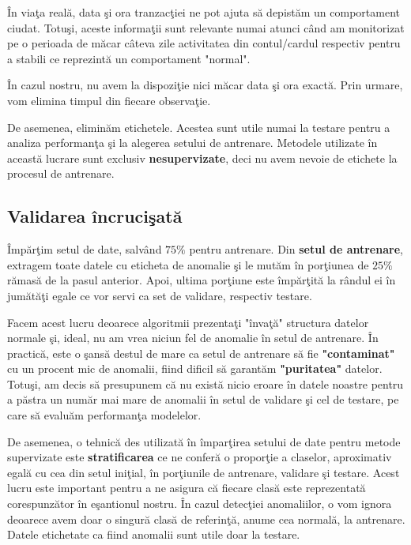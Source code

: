 În viaţa reală, data şi ora tranzacţiei ne pot ajuta să depistăm un comportament 
ciudat. Totuşi, aceste informaţii sunt relevante numai atunci când am monitorizat
pe o perioada de măcar câteva zile activitatea din contul/cardul respectiv pentru a 
stabili ce reprezintă un comportament "normal".

În cazul nostru, nu avem la dispoziţie nici măcar data şi ora exactă. Prin urmare, vom
elimina timpul din fiecare observaţie.

De asemenea, eliminăm etichetele. Acestea sunt utile numai la testare pentru a analiza 
performanţa şi la alegerea setului de antrenare. Metodele utilizate în această lucrare
sunt exclusiv \textbf{nesupervizate}, deci nu avem nevoie de etichete la procesul de antrenare.

\subsection{Validarea încrucişată}

Împărţim setul de date, salvând $75\%$ pentru antrenare. Din \textbf{setul de antrenare}, 
extragem toate
datele cu eticheta de anomalie şi le mutăm în porţiunea de $25\%$ rămasă de la pasul anterior.
Apoi, ultima porţiune este împărţită la rândul ei în jumătăţi egale ce vor servi ca set de validare, respectiv testare.

Facem acest lucru deoarece algoritmii prezentaţi "învaţă" structura datelor normale şi, ideal,
nu am vrea niciun fel de anomalie în setul de antrenare. În practică, este o şansă destul de 
mare ca setul de antrenare să fie \textbf{"contaminat"} cu un procent mic de anomalii, fiind dificil 
să garantăm \textbf{"puritatea"} datelor. Totuşi, am decis să presupunem că nu există nicio eroare 
în datele noastre pentru a păstra un număr mai mare de anomalii în setul de validare şi cel de 
testare, pe care să evaluăm performanţa modelelor.

De asemenea, o tehnică des utilizată în împarţirea setului de date pentru metode supervizate 
este \textbf{stratificarea} ce ne conferă o proporţie a claselor, aproximativ egală cu 
cea din setul iniţial, în porţiunile
de antrenare, validare şi testare. Acest lucru este important pentru a ne asigura că fiecare 
clasă este reprezentată corespunzător în eşantionul nostru. În cazul detecţiei anomaliilor, 
o vom ignora deoarece avem doar o singură clasă de referinţă, anume cea normală, la antrenare. 
Datele etichetate ca fiind anomalii sunt utile doar la testare.

